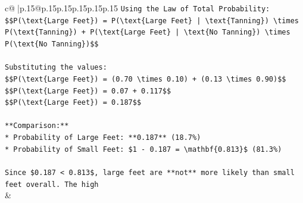 \documentclass{article}
\begin{document}
{\begin{supertabular}{c@{$\;$}|p{.15\linewidth}@{}p{.15\linewidth}p{.15\linewidth}p{.15\linewidth}p{.15\linewidth}p{.15\linewidth}}
{{{\texttt{Using the Law of Total Probability:} \\
\texttt{\$\$P(\textbackslash{}text\{Large Feet\}) = P(\textbackslash{}text\{Large Feet\} | \textbackslash{}text\{Tanning\}) \textbackslash{}times P(\textbackslash{}text\{Tanning\}) + P(\textbackslash{}text\{Large Feet\} | \textbackslash{}text\{No Tanning\}) \textbackslash{}times P(\textbackslash{}text\{No Tanning\})\$\$} \\
\\ 
\texttt{Substituting the values:} \\
\texttt{\$\$P(\textbackslash{}text\{Large Feet\}) = (0.70 \textbackslash{}times 0.10) + (0.13 \textbackslash{}times 0.90)\$\$} \\
\texttt{\$\$P(\textbackslash{}text\{Large Feet\}) = 0.07 + 0.117\$\$} \\
\texttt{\$\$P(\textbackslash{}text\{Large Feet\}) = 0.187\$\$} \\
\\ 
\texttt{**Comparison:**} \\
\texttt{*   Probability of Large Feet: **0.187** (18.7\%)} \\
\texttt{*   Probability of Small Feet: \$1 {-} 0.187 = \textbackslash{}mathbf\{0.813\}\$ (81.3\%)} \\
\\ 
\texttt{Since \$0.187 < 0.813\$, large feet are **not** more likely than small feet overall. The high} \\
            }
        }
    }
    & \\ \\


\end{supertabular}}
\end{document}
